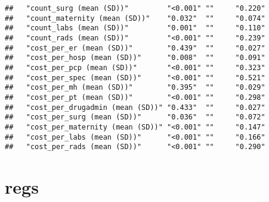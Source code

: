 \documentclass[]{article}
\begin{document}
\begin{verbatim}
##   "count_surg (mean (SD))"         "<0.001" ""     "0.220"
##   "count_maternity (mean (SD))"    "0.032"  ""     "0.074"
##   "count_labs (mean (SD))"         "0.001"  ""     "0.110"
##   "count_rads (mean (SD))"         "<0.001" ""     "0.239"
##   "cost_per_er (mean (SD))"        "0.439"  ""     "0.027"
##   "cost_per_hosp (mean (SD))"      "0.008"  ""     "0.091"
##   "cost_per_pcp (mean (SD))"       "<0.001" ""     "0.323"
##   "cost_per_spec (mean (SD))"      "<0.001" ""     "0.521"
##   "cost_per_mh (mean (SD))"        "0.395"  ""     "0.029"
##   "cost_per_pt (mean (SD))"        "<0.001" ""     "0.298"
##   "cost_per_drugadmin (mean (SD))" "0.433"  ""     "0.027"
##   "cost_per_surg (mean (SD))"      "0.036"  ""     "0.072"
##   "cost_per_maternity (mean (SD))" "<0.001" ""     "0.147"
##   "cost_per_labs (mean (SD))"      "<0.001" ""     "0.166"
##   "cost_per_rads (mean (SD))"      "<0.001" ""     "0.290"
\end{verbatim}

\section{regs}\label{regs}
\end{document}
